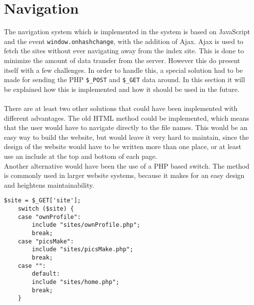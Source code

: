 \section{Navigation}
\label{sec:navigation}
The navigation system which is implemented in the system is based on JavaScript and the event \texttt{window.onhashchange}, with the addition of Ajax.
Ajax is used to fetch the sites without ever navigating away from the index site. This is done to minimize the amount of data transfer from the server. However this do present itself with a few challenges. In order to handle this, a special solution had to be made for sending the PHP \texttt{\$\_POST} and \texttt{\$\_GET} data around. In this section it will be explained how this is implemented and how it should be used in the future.\\
\\
There are at least two other solutions that could have been implemented with different advantages. The old HTML method could be implemented, which means that the user would have to navigate directly to the file names. This would be an easy way to build the website, but would leave it very hard to maintain, since the design of the website would have to be written more than one place, or at least use an include at the top and bottom of each page.\\
Another alternative would have been the use of a PHP based switch. The method is commonly used in larger website systems, because it makes for an easy design and heightens maintainability.
\lstset{language=PHP}
\begin{lstlisting}[firstline=1,caption={A PHP switch Example},label=lst:phpSwitch]
	$site = $_GET['site'];
	switch ($site) {
    case "ownProfile":
        include "sites/ownProfile.php";
        break;
    case "picsMake":
        include "sites/picsMake.php";
        break;
    case "":
		default:
        include "sites/home.php";
        break;
	}
\end{lstlisting}

